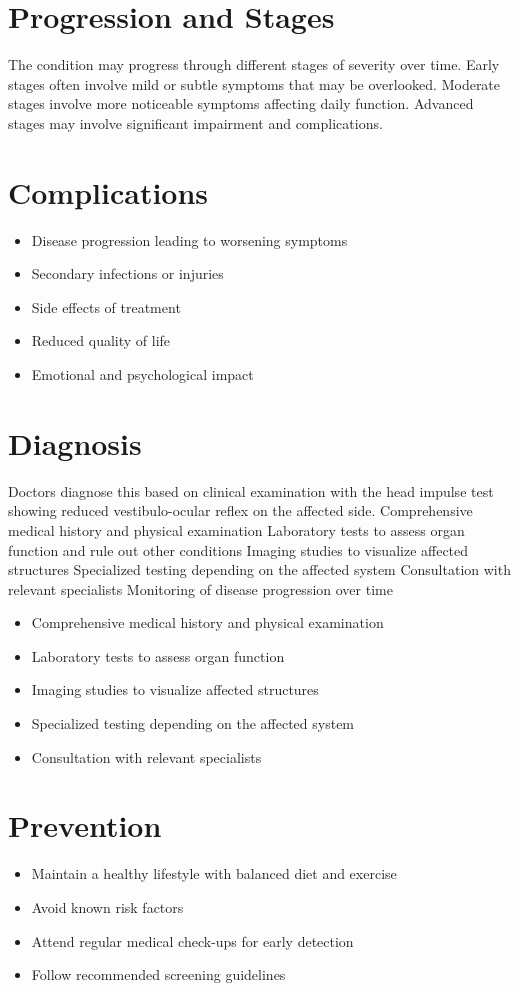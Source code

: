 \section{Progression and Stages}
The condition may progress through different stages of severity over time. Early stages often involve mild or subtle symptoms that may be overlooked. Moderate stages involve more noticeable symptoms affecting daily function. Advanced stages may involve significant impairment and complications.
\section{Complications}
\begin{itemize}[noitemsep]
  \item Disease progression leading to worsening symptoms
  \item Secondary infections or injuries
  \item Side effects of treatment
  \item Reduced quality of life
  \item Emotional and psychological impact
\end{itemize}
\section{Diagnosis}
Doctors diagnose this based on clinical examination with the head impulse test showing reduced vestibulo-ocular reflex on the affected side. Comprehensive medical history and physical examination Laboratory tests to assess organ function and rule out other conditions Imaging studies to visualize affected structures Specialized testing depending on the affected system Consultation with relevant specialists Monitoring of disease progression over time

\begin{itemize}[noitemsep]
  \item Comprehensive medical history and physical examination
  \item Laboratory tests to assess organ function
  \item Imaging studies to visualize affected structures
  \item Specialized testing depending on the affected system
  \item Consultation with relevant specialists
\end{itemize}
\section{Prevention}
\begin{itemize}[noitemsep]
  \item Maintain a healthy lifestyle with balanced diet and exercise
  \item Avoid known risk factors
  \item Attend regular medical check-ups for early detection
  \item Follow recommended screening guidelines
\end{itemize}
